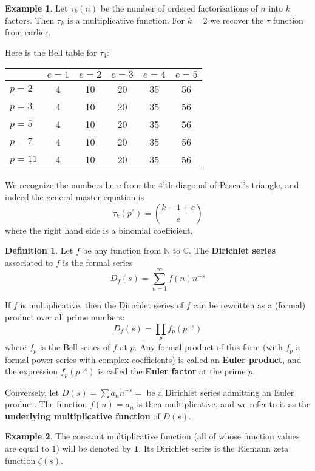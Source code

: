 \documentclass[a4paper]{article}
\theoremstyle{definition}
\newtheorem{definition}{Definition}[section]
\newtheorem{example}{Example}[section]
\theoremstyle{remark}
\newcommand{\one}{\mathbf{1}}
\newcommand{\N}{\mathbb{N}}
\newcommand{\C}{\mathbb{C}}
\newcommand{\defhl}[1]{\textbf{#1}}
\begin{document}
\begin{example}
Let $\tau_k(n)$ be the number of ordered factorizations of $n$ into $k$ factors. Then $\tau_k$ is a multiplicative function. For $k=2$ we recover the $\tau$ function from earlier.

Here is the Bell table for $\tau_4$:
\vskip10pt
\begin{center}
\begin{tabular}{| l | | c | c | c | c | c |}
\hline
& $e = 1$ & $e = 2$ & $e = 3$ & $e = 4$ & $e = 5$\\
\hline
\hline
$p = 2$ & 4 & 10 & 20 & 35 & 56 \\
\hline
$p = 3$ & 4 & 10 & 20 & 35 & 56 \\
\hline
$p = 5$ & 4 & 10 & 20 & 35 & 56 \\
\hline
$p = 7$ & 4 & 10 & 20 & 35 & 56 \\
\hline
$p = 11$ & 4 & 10 & 20 & 35 & 56 \\
\hline
\end{tabular}
\end{center}
We recognize the numbers here from the 4'th diagonal of Pascal's triangle, and indeed the general master equation is
$$ \tau_k(p^e) =  \binom{k-1+e}{e}  $$
where the right hand side is a binomial coefficient.
\end{example}


\begin{definition}
Let $f$ be any function from $\N$ to $\C$. The \defhl{Dirichlet series} associated to $f$ is the formal series
$$  D_f(s) = \sum_{n=1}^{\infty} f(n) n^{-s}   $$

If $f$ is multiplicative, then the Dirichlet series of $f$ can be rewritten as a (formal) product over all prime numbers:
$$  D_f(s) = \prod_p f_p(p^{-s})   $$
where $f_p$ is the Bell series of $f$ at $p$. Any formal product of this form (with $f_p$ a formal power series with complex coefficients) is called an \defhl{Euler product}, and the expression $f_p(p^{-s})$ is called the \defhl{Euler factor} at the prime $p$. 

Conversely, let $D(s) = \sum a_n n^{-s} = $ be a Dirichlet series admitting an Euler product. The function  $f(n) = a_n$ is then multiplicative, and we refer to it as the \defhl{underlying multiplicative function} of $D(s)$.
\end{definition}

\begin{example}
The constant multiplicative function (all of whose function values are equal to $1$) will be denoted by $\one$. Its Dirichlet series is the Riemann zeta function $\zeta(s)$. 
\end{example}
\end{document}
